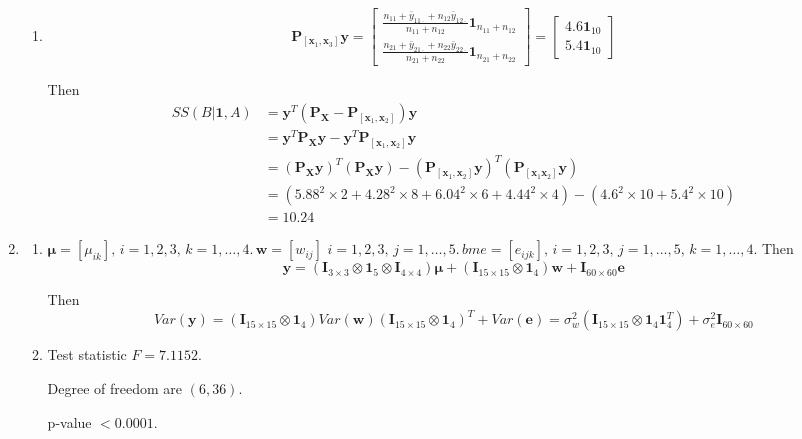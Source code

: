 \documentclass{article}
\begin{document}
\begin{enumerate}[leftmargin = 0 em, label = \arabic*., font = \bfseries]
\begin{enumerate}
 	\item 
 	\[\bm P_{[\bm x_1 , \bm x_3]} \bm y = \begin{bmatrix}
 		\frac{n_{11} + \bar{y}_{11 \cdot} + n_{12} \bar{y}_{12 \cdot}}{n_{11} + n_{12}} \bm 1_{n_{11} + n_{12}}\\
 		\frac{n_{21} + \bar{y}_{21 \cdot} + n_{22} \bar{y}_{22 \cdot}}{n_{21} + n_{22}} \bm 1_{n_{21} + n_{22}}
 	\end{bmatrix} = \begin{bmatrix}
 		4.6 \bm 1_{10} \\ 5.4 \bm 1_{10}
 	\end{bmatrix}\]

 	Then 
	\begin{align*}
	 	SS(B|\bm 1, A) & = \bm y^T (\bm P_{\bm X} - \bm P_{[\bm x_1, \bm x_2]}) \bm y\\
	 	& = \bm y^T \bm P_{\bm X} \bm y - \bm y^T \bm P_{[\bm x_1, \bm x_2]} \bm y\\
	 	& = (\bm P_{\bm X} \bm y)^T(\bm P_{\bm X} \bm y) - (\bm P_{[\bm x_1, \bm x_2]} \bm y)^T (\bm P_{[\bm x_1 \bm x_2]}\bm y)\\
	 	& = (5.88^2 \times 2 + 4.28^2 \times 8 + 6.04^2 \times 6 + 4.44^2 \times 4) - (4.6^2 \times 10 + 5.4^2 \times 10)\\
	 	& = 10.24
	 	\end{align*}

	\end{enumerate}

	\item 
	\begin{enumerate}
		\item 
		$\bm \mu = [\mu_{ik}],\, i = 1,2, 3,\, k = 1,\ldots, 4. \, \bm w = [w_{ij}]\,\, i = 1,2,3,\, j = 1, \ldots, 5.\, bm e = [e_{ijk}],\, i = 1,2,3,\, j = 1,\ldots, 5,\, k = 1, \ldots , 4$. Then
		\[\bm y = (\bm I_{3 \times 3} \otimes \bm 1_{5} \otimes \bm I_{4 \times 4}) \bm \mu + (\bm I_{15 \times 15} \otimes \bm 1_{4}) \bm w + \bm I_{60 \times 60} \bm e\]

		Then
		\[Var(\bm y) = (\bm I_{15 \times 15} \otimes \bm 1_{4}) Var(\bm w) (\bm I_{15 \times 15} \otimes \bm 1_{4})^T + Var(\bm e) = \sigma_w^2(\bm I_{15 \times 15} \otimes \bm 1_{4}\bm 1_4^T)  + \sigma_e^2 \bm I_{60 \times 60} \]

		\item 
		Test statistic $F = 7.1152$. 

		Degree of freedom are $(6, 36)$.

		p-value $< 0.0001$.


\end{enumerate}
\end{enumerate}
\end{document}

